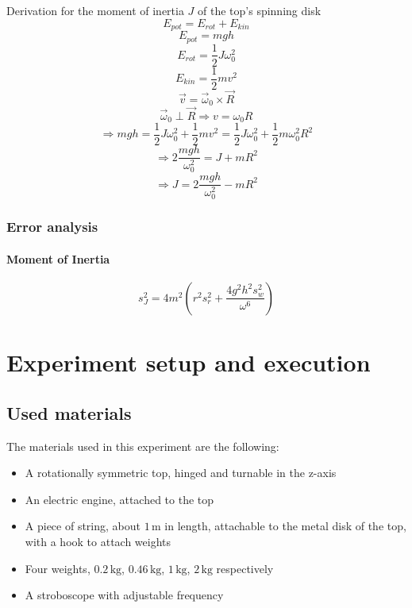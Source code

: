 \documentclass{scrreprt}
\newcommand{\unit}[1]{\ensuremath{\, \mathrm{#1}}}
\begin{document}
Derivation for the moment of inertia $J$ of the top's spinning disk
\begin{equation}
	E_{pot}=E_{rot}+E_{kin}
\end{equation}
\begin{equation}
	E_{pot}=mgh
\end{equation}
\begin{equation}
	E_{rot}=\frac{1}{2}J\omega_0^2
\end{equation}
\begin{equation}
	E_{kin}=\frac{1}{2}mv^2
\end{equation}
\begin{equation}
	\vec{v}=\vec{\omega}_0\times\vec{R}
\end{equation}
\begin{equation}
	\vec{\omega}_0\perp\vec{R}\Rightarrow v=\omega_0R
\end{equation}
\begin{equation}
	\Rightarrow mgh=\frac{1}{2}J\omega_0^2+\frac{1}{2}mv^2=\frac{1}{2}J\omega_0^2+\frac{1}{2}m\omega_0^2R^2
\end{equation}
\begin{equation}
	\Rightarrow 2\frac{mgh}{\omega_0^2}=J+mR^2
\end{equation}
\begin{equation}
	\Rightarrow J=2\frac{mgh}{\omega_0^2}-mR^2
\end{equation}

\subsubsection{Error analysis}
\paragraph*{Moment of Inertia}

\begin{equation}
s_J^2 = 4 m^2 \left( r^2 s_r^2 + \frac{4 g^2 h^2 s_w^2}{\omega^6} \right)
\end{equation}

\section{Experiment setup and execution}

\subsection{Used materials}
The materials used in this experiment are the following:
\begin{itemize}
\item A rotationally symmetric top, hinged and turnable in the z-axis
\item An electric engine, attached to the top
\item A piece of string, about $1 \unit{m}$ in length, attachable to the metal disk of the top, with a hook to attach weights
\item Four weights, $0.2 \unit{kg}$, $0.46 \unit{kg}$, $1 \unit{kg}$, $2 \unit{kg}$ respectively
\item A stroboscope with adjustable frequency
\end{itemize}
\end{document}
